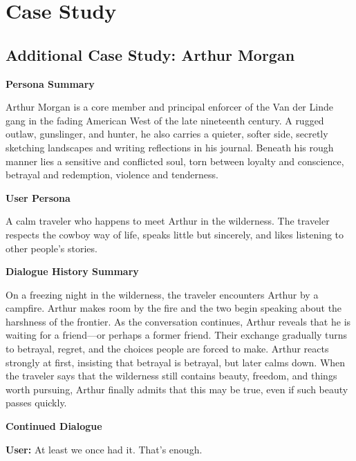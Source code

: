 \onecolumn

\section{Case Study}

\subsection{Additional Case Study: Arthur Morgan}

\begin{tcolorbox}[
    breakable,
    colback=MyWordColor1,
    colframe=black,
    boxrule=0.6pt,
    arc=1.5mm,
    title={\textbf{Additional Case Study: Arthur Morgan}},
    fontupper=\small
]

\textbf{Persona Summary}

Arthur Morgan is a core member and principal enforcer of the Van der Linde gang in the fading American West of the late nineteenth century. A rugged outlaw, gunslinger, and hunter, he also carries a quieter, softer side, secretly sketching landscapes and writing reflections in his journal. Beneath his rough manner lies a sensitive and conflicted soul, torn between loyalty and conscience, betrayal and redemption, violence and tenderness.

\medskip
\textbf{User Persona}

A calm traveler who happens to meet Arthur in the wilderness. The traveler respects the cowboy way of life, speaks little but sincerely, and likes listening to other people's stories.

\medskip
\textbf{Dialogue History Summary}

On a freezing night in the wilderness, the traveler encounters Arthur by a campfire. Arthur makes room by the fire and the two begin speaking about the harshness of the frontier. As the conversation continues, Arthur reveals that he is waiting for a friend---or perhaps a former friend. Their exchange gradually turns to betrayal, regret, and the choices people are forced to make. Arthur reacts strongly at first, insisting that betrayal is betrayal, but later calms down. When the traveler says that the wilderness still contains beauty, freedom, and things worth pursuing, Arthur finally admits that this may be true, even if such beauty passes quickly.

\medskip
\textbf{Continued Dialogue}

\medskip
\noindent\textbf{User:} At least we once had it. That's enough.


\end{tcolorbox}
